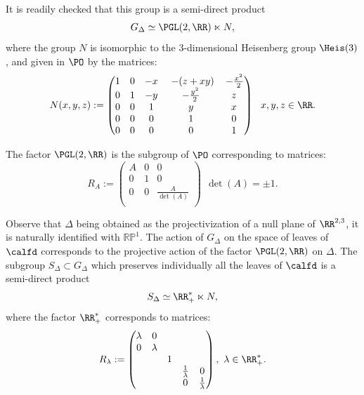 It is readily checked that this group is a semi-direct product
\[
G_{\Delta} \simeq \PGL(2,\RR) \ltimes N,
\]
where the group $N$ is isomorphic to the $3$-dimensional
Heisenberg group $\Heis(3)$, and given in $\PO$ by the matrices:
\begin{equation}\label{eq.formule.heisenberg}
N(x,y,z):=
\begin{pmatrix}
1&0&-x&\, \, {-(z+xy)}&\, -\frac{x^2}{2}\\
0&1&-y&-\frac{y^2}{2}&z\\
0&0&1&y&x\\
0&0&0&1&0\\
0&0&0&0&1\\
\end{pmatrix} \ \ x,y,z \in \RR.
\end{equation}

The factor $\PGL(2,\RR)$ is the subgroup of $\PO$ corresponding to matrices:
\begin{equation}
R_A:= \label{eq.formule.pgl2}
\begin{pmatrix}
A &0&0\\
0&1&0\\
0&0&\frac{A}{\operatorname{det}(A)}\\
\end{pmatrix}  \ \ \det(A)=\pm 1.
\end{equation}

Observe that $\Delta$ being obtained as the projectivization of a null plane of $\RR^{2,3}$, it is naturally identified with ${\mathbb{RP}^1}$. The action of $G_{\Delta}$ on the space of leaves of $\calfd$ corresponds to the projective action of the factor $\PGL(2,\RR)$ on $\Delta$. The subgroup $S_{\Delta} \subset G_{\Delta}$ which preserves individually all the leaves of $\calfd$ is a semi-direct product
\[
S_{\Delta} \simeq \RR_+^* \ltimes N,
\]
where the factor $\RR_+^*$ corresponds to matrices:
\begin{equation}
R_{\lambda}:= \label{eq.facteurR}
\begin{pmatrix}
\lambda&0& & & \\
0& \lambda & & & \\
& & 1 & & \\
& & & \frac{1}{\lambda}&0\\
& & & 0& \frac{1}{\lambda}\\
\end{pmatrix}, \ \lambda \in \RR_+^*.
\end{equation}



